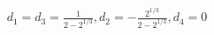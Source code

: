 \documentclass[preview]{standalone}
\begin{document}
\begin{align*}
d_1=d_3=\frac{1}{2-2^{1/3}}, d_2=-\frac{2^{1/3}}{2-2^{1/3}}, d_4=0
\end{align*}
\end{document}
